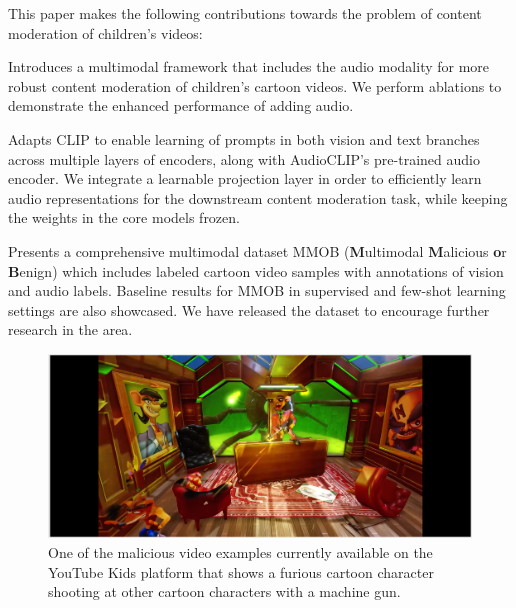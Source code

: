 \documentclass[letterpaper]{article}
\begin{document}
This paper makes the following contributions towards the problem of content moderation of children's videos:
\begin{compactenum}
    \item Introduces a multimodal framework that includes the audio modality for more robust content moderation of children's cartoon videos. We perform ablations to demonstrate the enhanced performance of adding audio.
    
    \item Adapts CLIP to enable learning of prompts in both vision and text branches across multiple layers of encoders, along with AudioCLIP's pre-trained audio encoder.  We integrate a learnable projection layer in order to efficiently learn audio representations for the downstream content moderation task, while keeping the weights in the core models frozen.
    
    \item Presents a comprehensive multimodal dataset MMOB (\textbf{M}ultimodal \textbf{M}alicious \textbf{o}r \textbf{B}enign) which includes labeled cartoon video samples with annotations of vision and audio labels. Baseline results for MMOB in supervised and few-shot learning settings are also showcased. We have released the dataset to encourage further research in the area.
\end{compactenum}


\begin{figure}[htp]
    \centering
    \includegraphics[width=0.85\columnwidth]{figures/violent.png}
    \caption{One of the malicious video examples currently available on the YouTube Kids platform that shows a furious cartoon character shooting at other cartoon characters with a machine gun.}
    \label{fig:ytkmachinegun}
\end{figure}
\end{document}
